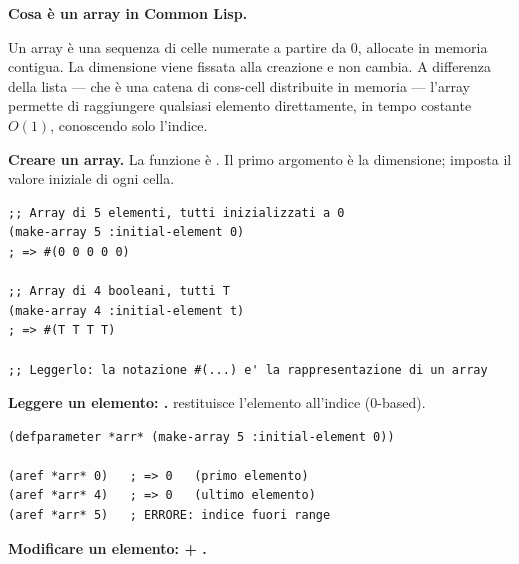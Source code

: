 \begin{tcolorbox}[
  enhanced,
  colback=black!2, colframe=black!20,
  arc=3pt, boxrule=0.4pt,
  left=12pt, right=12pt, top=9pt, bottom=9pt,
  before skip=8pt, after skip=10pt
]
\small\color{black!65}

\textbf{Cosa è un array in Common Lisp.}

\medskip
Un array è una sequenza di celle numerate a partire da 0,
allocate in memoria contigua.
La dimensione viene fissata alla creazione e non cambia.
A differenza della lista --- che è una catena di cons-cell distribuite
in memoria --- l'array permette di raggiungere qualsiasi elemento
direttamente, in tempo costante $O(1)$, conoscendo solo l'indice.

\medskip
\textbf{Creare un array.}
La funzione è . Il primo argomento è la dimensione;
 imposta il valore iniziale di ogni cella.

\begin{tcolorbox}[
  enhanced, colback=clBg, colframe=gray!40,
  arc=2pt, boxrule=0.4pt,
  left=8pt, right=6pt, top=4pt, bottom=4pt,
  before skip=4pt, after skip=4pt
]
\begin{lstlisting}
;; Array di 5 elementi, tutti inizializzati a 0
(make-array 5 :initial-element 0)
; => #(0 0 0 0 0)

;; Array di 4 booleani, tutti T
(make-array 4 :initial-element t)
; => #(T T T T)

;; Leggerlo: la notazione #(...) e' la rappresentazione di un array
\end{lstlisting}
\end{tcolorbox}

\textbf{Leggere un elemento: .}
 restituisce l'elemento all'indice  (0-based).

\begin{tcolorbox}[
  enhanced, colback=clBg, colframe=gray!40,
  arc=2pt, boxrule=0.4pt,
  left=8pt, right=6pt, top=4pt, bottom=4pt,
  before skip=4pt, after skip=4pt
]
\begin{lstlisting}
(defparameter *arr* (make-array 5 :initial-element 0))

(aref *arr* 0)   ; => 0   (primo elemento)
(aref *arr* 4)   ; => 0   (ultimo elemento)
(aref *arr* 5)   ; ERRORE: indice fuori range
\end{lstlisting}
\end{tcolorbox}

\textbf{Modificare un elemento:  + .}


\end{tcolorbox}
